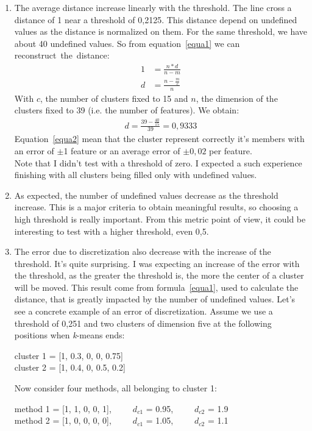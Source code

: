 \documentclass[12pt]{article}
\newcommand{\code}[1]{{\fontfamily{phv}\selectfont \small{\begin{tabbing} #1 \end{tabbing}}}}
\begin{document}
\begin{enumerate}
\item The average distance increase linearly with the threshold. The line cross a distance of 1 near a threshold of 0,2125. This distance depend on undefined values as the distance is normalized on them. For the same threshold, we have about 40 undefined values. So from equation~\ref{equa1} we can reconstruct~the~distance:\begin{align*}
1 &=\frac{n*d}{n-m}\\
d &= \frac{n-\frac{m}{c}}{n}
\end{align*} With $c$, the number of clusters fixed to 15 and $n$, the dimension of the clusters fixed to 39 (i.e. the number of features). We obtain:\begin{align}\label{equa2}
d = \frac{39-\frac{40}{15}}{39} = 0,9333
\end{align}
Equation~\ref{equa2} mean that the cluster represent correctly it's members with an error of $\pm$1 feature or an average error of $\pm0,02$ per feature.\\ Note that I didn't test with a threshold of zero. I expected a such experience finishing with all clusters being filled only with undefined values.
\item As expected, the number of undefined values decrease as the threshold increase. This is a major criteria to obtain meaningful results, so choosing a high threshold is really important. From this metric point of view, it could be interesting to test with a higher threshold, even 0,5.
\item The error due to discretization also decrease with the increase of the threshold. It's quite surprising. I was expecting an increase of the error with the threshold, as the greater the threshold is, the more the center of a cluster will be moved. This result come from formula~\ref{equa1}, used to calculate the distance, that is greatly impacted by the number of undefined values. Let's see a concrete example of an error of discretization. Assume we use a threshold of 0,251 and two clusters of dimension five at the following positions when \textit{k}-means ends:\code{
cluster 1  = [1, 0.3, 0, 0, 0.75]\\
cluster 2 = [1, 0.4, 0, 0.5, 0.2]}
Now consider four methods, all belonging to cluster 1:
\code{method 1 = [1, 1, 0, 0, 1],\ \ \ \ \  $d_{c1}$ = 0.95,\ \ \ \ \  $d_{c2}$ = 1.9\\
method 2 = [1, 0, 0, 0, 0],\ \ \ \ \  $d_{c1}$ = 1.05,\ \ \ \ \  $d_{c2}$ = 1.1\\
}
\end{enumerate}
\end{document}
